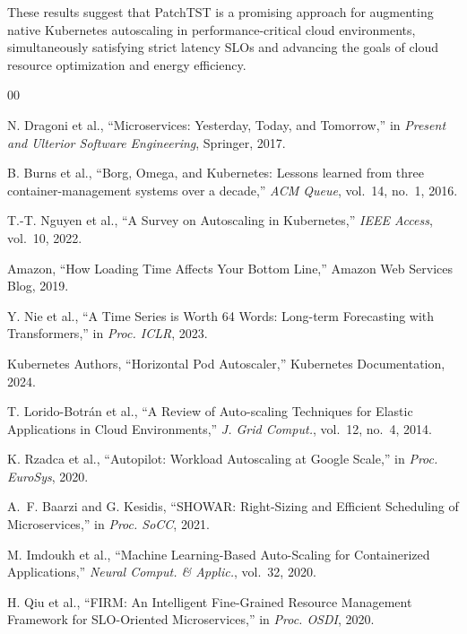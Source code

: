 \documentclass[conference]{IEEEtran}
\begin{document}
These results suggest that PatchTST is a promising approach for augmenting native Kubernetes autoscaling in performance-critical cloud environments, simultaneously satisfying strict latency SLOs and advancing the goals of cloud resource optimization and energy efficiency.

\begin{thebibliography}{00}

 N. Dragoni et al., ``Microservices: Yesterday, Today, and Tomorrow,'' in \textit{Present and Ulterior Software Engineering}, Springer, 2017.

 B. Burns et al., ``Borg, Omega, and Kubernetes: Lessons learned from three container-management systems over a decade,'' \textit{ACM Queue}, vol.~14, no.~1, 2016.

 T.-T. Nguyen et al., ``A Survey on Autoscaling in Kubernetes,'' \textit{IEEE Access}, vol.~10, 2022.

 Amazon, ``How Loading Time Affects Your Bottom Line,'' Amazon Web Services Blog, 2019.

 Y. Nie et al., ``A Time Series is Worth 64 Words: Long-term Forecasting with Transformers,'' in \textit{Proc. ICLR}, 2023.

 Kubernetes Authors, ``Horizontal Pod Autoscaler,'' Kubernetes Documentation, 2024.

 T. Lorido-Botr\'an et al., ``A Review of Auto-scaling Techniques for Elastic Applications in Cloud Environments,'' \textit{J. Grid Comput.}, vol.~12, no.~4, 2014.

 K. Rzadca et al., ``Autopilot: Workload Autoscaling at Google Scale,'' in \textit{Proc. EuroSys}, 2020.

 A.~F. Baarzi and G. Kesidis, ``SHOWAR: Right-Sizing and Efficient Scheduling of Microservices,'' in \textit{Proc. SoCC}, 2021.

 M. Imdoukh et al., ``Machine Learning-Based Auto-Scaling for Containerized Applications,'' \textit{Neural Comput. \& Applic.}, vol.~32, 2020.

 H. Qiu et al., ``FIRM: An Intelligent Fine-Grained Resource Management Framework for SLO-Oriented Microservices,'' in \textit{Proc. OSDI}, 2020.


\end{thebibliography}
\end{document}
